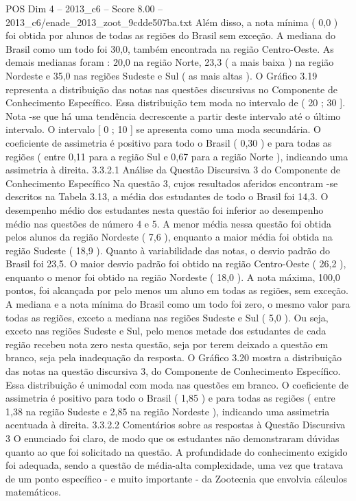 \begin{textsample}{POS Dim 4 – 2013\_c6 – Score 8.00 – 2013\_c6/enade\_2013\_zoot\_9cdde507ba.txt}
Além disso, a nota mínima ( 0,0 ) foi obtida por alunos de todas as regiões do Brasil sem exceção.
A mediana do Brasil como um todo foi 30,0, também encontrada na região Centro-Oeste.
As demais medianas foram : 20,0 na região Norte, 23,3 ( a mais baixa ) na região Nordeste e 35,0 nas regiões Sudeste e Sul ( as mais altas ).
O Gráfico 3.19 representa a distribuição das notas nas questões discursivas no Componente de Conhecimento Específico.
Essa distribuição tem moda no intervalo de ( 20 ; 30 ].
Nota -se que há uma tendência decrescente a partir deste intervalo até o último intervalo.
O intervalo [ 0 ; 10 ] se apresenta como uma moda secundária.
O coeficiente de assimetria é positivo para todo o Brasil ( 0,30 ) e para todas as regiões ( entre 0,11 para a região Sul e 0,67 para a região Norte ), indicando uma assimetria à direita. 3.3.2.1 Análise da Questão Discursiva 3 do Componente de Conhecimento Específico Na questão 3, cujos resultados aferidos encontram -se descritos na Tabela 3.13, a média dos estudantes de todo o Brasil foi 14,3.
O desempenho médio dos estudantes nesta questão foi inferior ao desempenho médio nas questões de número 4 e 5.
A menor média nessa questão foi obtida pelos alunos da região Nordeste ( 7,6 ), enquanto a maior média foi obtida na região Sudeste ( 18,9 ).
Quanto à variabilidade das notas, o desvio padrão do Brasil foi 23,5.
O maior desvio padrão foi obtido na região Centro-Oeste ( 26,2 ), enquanto o menor foi obtido na região Nordeste ( 18,0 ).
A nota máxima, 100,0 pontos, foi alcançada por pelo menos um aluno em todas as regiões, sem exceção.
A mediana e a nota mínima do Brasil como um todo foi zero, o mesmo valor para todas as regiões, exceto a mediana nas regiões Sudeste e Sul ( 5,0 ).
Ou seja, exceto nas regiões Sudeste e Sul, pelo menos metade dos estudantes de cada região recebeu nota zero nesta questão, seja por terem deixado a questão em branco, seja pela inadequação da resposta.
O Gráfico 3.20 mostra a distribuição das notas na questão discursiva 3, do Componente de Conhecimento Específico.
Essa distribuição é unimodal com moda nas questões em branco.
O coeficiente de assimetria é positivo para todo o Brasil ( 1,85 ) e para todas as regiões ( entre 1,38 na região Sudeste e 2,85 na região Nordeste ), indicando uma assimetria acentuada à direita. 3.3.2.2 Comentários sobre as respostas à Questão Discursiva 3 O enunciado foi claro, de modo que os estudantes não demonstraram dúvidas quanto ao que foi solicitado na questão.
A profundidade do conhecimento exigido foi adequada, sendo a questão de média-alta complexidade, uma vez que tratava de um ponto específico - e muito importante - da Zootecnia que envolvia cálculos matemáticos.

\end{textsample}

